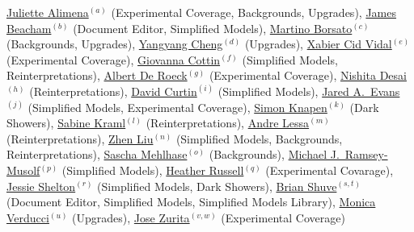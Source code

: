 \noindent  \href{mailto:juliette.alimena@cern.ch}{Juliette Alimena}$^{(a)}$ (Experimental Coverage, Backgrounds, Upgrades), \href{mailto:j.beacham@cern.ch}{James Beacham}$^{(b)}$ (Document Editor, Simplified Models), \href{mailto:martino.borsato@cern.ch}{Martino Borsato}$^{(c)}$ (Backgrounds, Upgrades),
\href{mailto:yangyang.cheng@cornell.edu}{Yangyang Cheng}$^{(d)}$ (Upgrades), \href{mailto:xabier.cid.vidal@cern.ch}{Xabier Cid Vidal}$^{(e)}$ (Experimental Coverage), \href{mailto:gcottin@phys.ntu.edu.tw}{Giovanna Cottin}$^{(f)}$ (Simplified Models, Reinterpretations), \href{mailto:deroeck@mail.cern.ch}{Albert De Roeck}$^{(g)}$ (Experimental Coverage), \href{mailto:ddesai@theory.tifr.res.in}{Nishita Desai}$^{(h)}$ (Reinterpretations), \href{mailto:dcurtin@physics.utoronto.ca}{David Curtin}$^{(i)}$ (Simplified Models), \href{mailto:jaredaevans@gmail.com}{Jared A.~Evans}$^{(j)}$ (Simplified Models, Experimental Coverage), \href{mailto:knapen@ias.edu}{Simon Knapen}$^{(k)}$ (Dark Showers), \href{mailto:sabine.kraml@lpsc.in2p3.fr}{Sabine Kraml}$^{(l)}$ (Reinterpretations), \href{mailto:andre.lessa@ufabc.edu.br}{Andre Lessa}$^{(m)}$ (Reinterpretations),  \href{mailto:zliuphys@umd.edu}{Zhen Liu}$^{(n)}$ (Simplified Models, Backgrounds, Reinterpretations), \href{mailto:sascha.mehlhase@cern.ch}{Sascha Mehlhase}$^{(o)}$ (Backgrounds), \href{mailto:mjrm@physics.umass.edu}{Michael J.~Ramsey-Musolf}$^{(p)}$ (Simplified Models),
\href{mailto:hrussell@cern.ch}{Heather Russell}$^{(q)}$ (Experimental Covarage), \href{mailto:sheltonj@illinois.edu}{Jessie Shelton}$^{(r)}$ (Simplified Models, Dark Showers), \href{mailto:bshuve@g.hmc.edu}{Brian Shuve}$^{(s,t)}$ (Document Editor, Simplified Models, Simplified Models Library),  \href{mailto:monica.verducci@cern.ch}{Monica Verducci}$^{(u)}$ (Upgrades), \href{mailto:jose.zurita@kit.edu}{Jose Zurita}$^{(v,w)}$ (Experimental Coverage)

\vspace{0.5cm}

